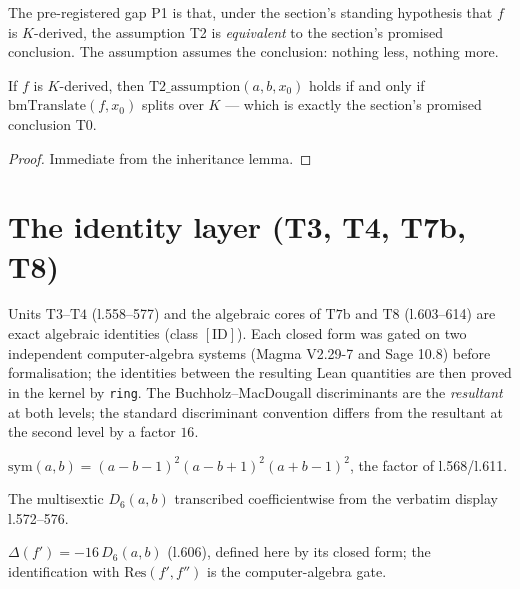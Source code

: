 The pre-registered gap P1 is that, under the section's standing hypothesis that $f$ is
$K$-derived, the assumption T2 is \emph{equivalent} to the section's promised
conclusion.  The assumption assumes the conclusion: nothing less, nothing more.

\begin{theorem}\label{T2_iff_conclusion}\leanok
{}
If $f$ is $K$-derived, then $\mathrm{T2\_assumption}(a,b,x_{0})$ holds if and only if
$\mathrm{bmTranslate}(f,x_{0})$ splits over $K$ --- which is exactly the section's
promised conclusion T0.
\end{theorem}
\begin{proof}\leanok
{}
Immediate from the inheritance lemma.
\end{proof}

\section{The identity layer (T3, T4, T7b, T8)}

Units $\mathrm{T3}$--$\mathrm{T4}$ (l.558--577) and the algebraic cores of
$\mathrm{T7b}$ and $\mathrm{T8}$ (l.603--614) are exact algebraic identities
(class $[\mathrm{ID}]$).  Each closed form was gated on two independent computer-algebra
systems (Magma V2.29-7 and Sage 10.8) before formalisation; the identities between the
resulting Lean quantities are then proved in the kernel by \texttt{ring}.  The
Buchholz--MacDougall discriminants are the \emph{resultant} at both levels; the standard
discriminant convention differs from the resultant at the second level by a factor $16$.

\begin{definition}\label{symF}\leanok
$\mathrm{sym}(a,b)=(a-b-1)^{2}(a-b+1)^{2}(a+b-1)^{2}$, the factor of l.568/l.611.
\end{definition}

\begin{definition}[$D_6$]\label{D6}\leanok
The multisextic $D_{6}(a,b)$ transcribed coefficientwise from the verbatim display
l.572--576.
\end{definition}

\begin{definition}[$\Delta(f')$]\label{deltaFp}\leanok
{}
$\Delta(f')=-16\,D_{6}(a,b)$ (l.606), defined here by its closed form; the
identification with $\mathrm{Res}(f',f'')$ is the computer-algebra gate.
\end{definition}

